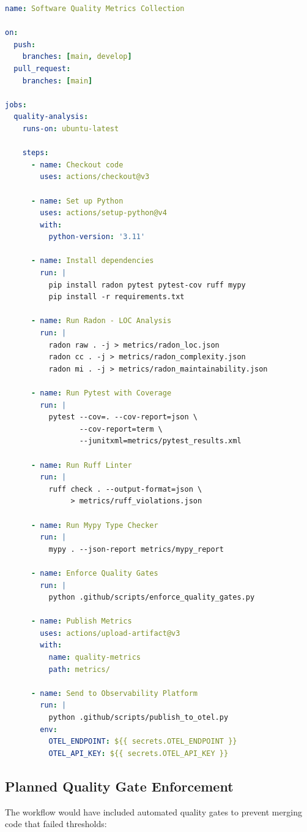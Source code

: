 \begin{lstlisting}[language=yaml, caption=Planned quality-metrics.yml Workflow]
name: Software Quality Metrics Collection

on:
  push:
    branches: [main, develop]
  pull_request:
    branches: [main]

jobs:
  quality-analysis:
    runs-on: ubuntu-latest

    steps:
      - name: Checkout code
        uses: actions/checkout@v3

      - name: Set up Python
        uses: actions/setup-python@v4
        with:
          python-version: '3.11'

      - name: Install dependencies
        run: |
          pip install radon pytest pytest-cov ruff mypy
          pip install -r requirements.txt

      - name: Run Radon - LOC Analysis
        run: |
          radon raw . -j > metrics/radon_loc.json
          radon cc . -j > metrics/radon_complexity.json
          radon mi . -j > metrics/radon_maintainability.json

      - name: Run Pytest with Coverage
        run: |
          pytest --cov=. --cov-report=json \
                 --cov-report=term \
                 --junitxml=metrics/pytest_results.xml

      - name: Run Ruff Linter
        run: |
          ruff check . --output-format=json \
               > metrics/ruff_violations.json

      - name: Run Mypy Type Checker
        run: |
          mypy . --json-report metrics/mypy_report

      - name: Enforce Quality Gates
        run: |
          python .github/scripts/enforce_quality_gates.py

      - name: Publish Metrics
        uses: actions/upload-artifact@v3
        with:
          name: quality-metrics
          path: metrics/

      - name: Send to Observability Platform
        run: |
          python .github/scripts/publish_to_otel.py
        env:
          OTEL_ENDPOINT: ${{ secrets.OTEL_ENDPOINT }}
          OTEL_API_KEY: ${{ secrets.OTEL_API_KEY }}
\end{lstlisting}

\subsection{Planned Quality Gate Enforcement}

The workflow would have included automated quality gates to prevent merging code that failed thresholds:

